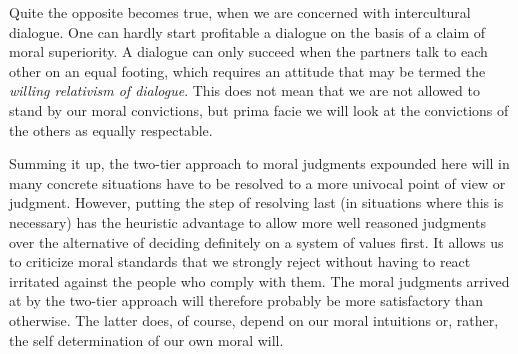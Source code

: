 \documentclass[12pt,a4paper,ngerman]{article}
\begin{document}
Quite the opposite becomes true, when we are concerned with intercultural
dialogue. One can hardly start profitable a dialogue on the basis of a claim
of moral superiority. A dialogue can only succeed when the partners talk to
each other on an equal footing, which requires an attitude that may be termed
the {\em willing relativism of dialogue}. This does not mean that we are not
allowed to stand by our moral convictions, but prima facie we will look at the
convictions of the others as equally respectable.

Summing it up, the two-tier approach to moral judgments expounded here will
in many concrete situations have to be resolved to a more univocal point of
view or judgment. However, putting the step of resolving last (in situations
where this is necessary) has the heuristic advantage to allow more well
reasoned judgments over the alternative of deciding definitely on a system of
values first. It allows us to criticize moral standards that we strongly
reject without having to react irritated against the people who comply with
them. The moral judgments arrived at by the two-tier approach will therefore
probably be more satisfactory than otherwise. The latter does, of course,
depend on our moral intuitions or, rather, the self determination of our own
moral will.


\newpage




\end{document}
